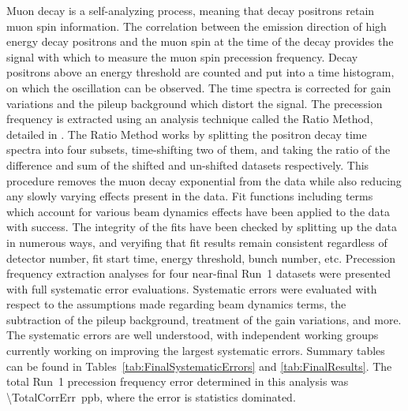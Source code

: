 Muon decay is a self-analyzing process, meaning that decay positrons retain muon spin information. The correlation between the emission direction of high energy decay positrons and the muon spin at the time of the decay provides the signal with which to measure the muon spin precession frequency. Decay positrons above an energy threshold are counted and put into a time histogram, on which the \wa oscillation can be observed. The time spectra is corrected for gain variations and the pileup background which distort the \gmtwo signal. The precession frequency is extracted using an analysis technique called the Ratio Method, detailed in . The Ratio Method works by splitting the positron decay time spectra into four subsets, time-shifting two of them, and taking the ratio of the difference and sum of the shifted and un-shifted datasets respectively. This procedure removes the muon decay exponential from the data while also reducing any slowly varying effects present in the data. Fit functions including terms which account for various beam dynamics effects have been applied to the data with success. The integrity of the fits have been checked by splitting up the data in numerous ways, and veryifing that fit results remain consistent regardless of detector number, fit start time, energy threshold, bunch number, etc. Precession frequency extraction analyses for four near-final Run~1 datasets were presented with full systematic error evaluations. Systematic errors were evaluated with respect to the assumptions made regarding beam dynamics terms, the subtraction of the pileup background, treatment of the gain variations, and more. The systematic errors are well understood, with independent working groups currently working on improving the largest systematic errors. Summary tables can be found in Tables~\ref{tab:FinalSystematicErrors} and \ref{tab:FinalResults}. The total Run~1 precession frequency error determined in this analysis was \SI{\TotalCorrErr}{ppb}, where the error is statistics dominated.


